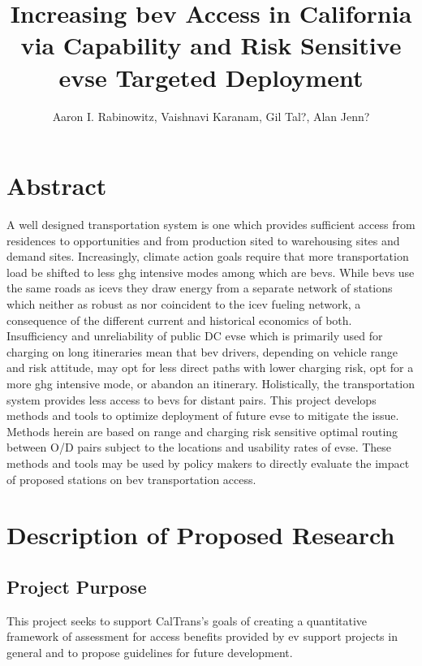 \documentclass[12pt]{article}
\title{Increasing \gls{bev} Access in California via Capability and Risk Sensitive \gls{evse} Targeted Deployment}
\author{Aaron I. Rabinowitz, Vaishnavi Karanam, Gil Tal?, Alan Jenn?}
\date{}
\begin{document}
\maketitle

\section*{Abstract}

A well designed transportation system is one which provides sufficient access from residences to opportunities and from production sited to warehousing sites and demand sites. Increasingly, climate action goals require that more transportation load be shifted to less \gls{ghg} intensive modes among which are \glspl{bev}. While \glspl{bev} use the same roads as \glspl{icev} they draw energy from a separate network of stations which neither as robust as nor coincident to the \gls{icev} fueling network, a consequence of the different current and historical economics of both. Insufficiency and unreliability of public DC \gls{evse} which is primarily used for charging on long itineraries mean that \gls{bev} drivers, depending on vehicle range and risk attitude, may opt for less direct paths with lower charging risk, opt for a more \gls{ghg} intensive mode, or abandon an itinerary. Holistically, the transportation system provides less access to \glspl{bev} for distant pairs. This project develops methods and tools to optimize deployment of future \gls{evse} to mitigate the issue. Methods herein are based on range and charging risk sensitive optimal routing between O/D pairs subject to the locations and usability rates of \gls{evse}. These methods and tools may be used by policy makers to directly evaluate the impact of proposed stations on \gls{bev} transportation access.

\section*{Description of Proposed Research}

\subsection*{Project Purpose}

This project seeks to support CalTrans's goals of creating a quantitative framework of assessment for access benefits provided by \gls{ev} support projects in general and to propose guidelines for future development.
\end{document}

